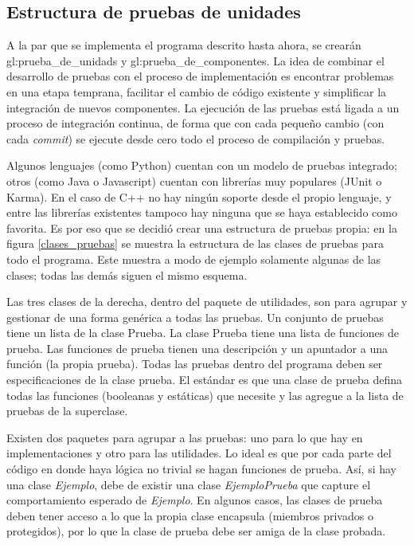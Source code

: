%
%
%

\subsection{Estructura de pruebas de unidades}

A la par que se implementa el programa descrito hasta ahora, se crearán
\glspl{gl:prueba_de_unidad} y \glspl{gl:prueba_de_componente}. La idea de
combinar el desarrollo de pruebas con el proceso de implementación es encontrar
problemas en una etapa temprana, facilitar el cambio de código existente y
simplificar la integración de nuevos componentes. La ejecución de las pruebas
está ligada a un proceso de integración continua, de forma que con
cada pequeño cambio (con cada \textit{commit}) se ejecute desde cero todo el
proceso de compilación y pruebas.

Algunos lenguajes (como Python) cuentan con un modelo de pruebas integrado;
otros (como Java o Javascript) cuentan con librerías muy populares (JUnit o
Karma). En el caso de C++ no hay ningún soporte desde el propio lenguaje, y
entre las librerías existentes tampoco hay ninguna que se haya establecido como
favorita. Es por eso que se decidió crear una estructura de pruebas propia:
en la figura \ref{clases_pruebas} se muestra la estructura de las clases de
pruebas para todo el programa. Este muestra a modo de ejemplo solamente algunas
de las clases; todas las demás siguen el mismo esquema.

Las tres clases de la derecha, dentro del paquete de utilidades, son para
agrupar y gestionar de una forma genérica a todas las pruebas. Un conjunto de
pruebas tiene un lista de la clase Prueba. La clase Prueba tiene una lista de
funciones de prueba. Las funciones de prueba tienen una descripción y un
apuntador a una función (la propia prueba). Todas las pruebas dentro del
programa deben ser especificaciones de la clase prueba. El estándar es que una
clase de prueba defina todas las funciones (booleanas y estáticas) que necesite
y las agregue a la lista de pruebas de la superclase.

Existen dos paquetes para agrupar a las pruebas: uno para lo que hay en
implementaciones y otro para las utilidades. Lo ideal es que por cada parte del
código en donde haya lógica no trivial se hagan funciones de prueba. Así, si hay
una clase \textit{Ejemplo}, debe de existir una clase \textit{EjemploPrueba}
que capture el comportamiento esperado de \textit{Ejemplo}. En algunos casos,
las clases de prueba deben tener acceso a lo que la propia clase encapsula
(miembros privados o protegidos), por lo que la clase de prueba debe ser amiga
de la clase probada.

